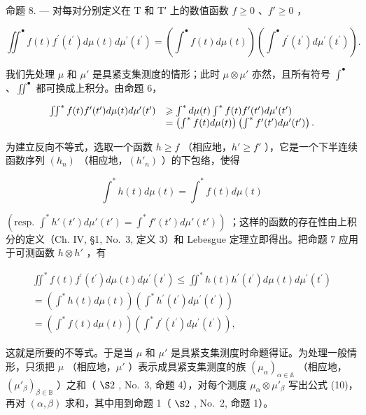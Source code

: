 命题 8. --- 对每对分别定义在 T 和 T′ 上的数值函数 \(f \geqslant 0\) 、\(f' \geqslant 0\) ，

\[
\iint^ {\bullet} f (t) f ^ {\prime} \left(t ^ {\prime}\right) d \mu (t) d \mu^ {\prime} \left(t ^ {\prime}\right) = \left(\int^ {\bullet} f (t) d \mu (t)\right) \left(\int^ {\bullet} f ^ {\prime} \left(t ^ {\prime}\right) d \mu^ {\prime} \left(t ^ {\prime}\right)\right).\tag{10}
\]

我们先处理 \(\mu\) 和 \(\mu'\) 是具紧支集测度的情形；此时 \(\mu \otimes \mu'\) 亦然，且所有符号 \(\int^{\bullet}\) 、\(\iint^{\bullet}\) 都可换成上积分。由命题 6，

\[
\begin{array}{r l} \iint^ {*} f (t) f ^ {\prime} (t ^ {\prime}) d \mu (t) d \mu^ {\prime} (t ^ {\prime}) & \geqslant \int^ {*} d \mu (t) \int^ {*} f (t) f ^ {\prime} (t ^ {\prime}) d \mu^ {\prime} (t ^ {\prime}) \\ & = \left(\int^ {*} f (t) d \mu (t)\right) \left(\int^ {*} f ^ {\prime} (t ^ {\prime}) d \mu^ {\prime} (t ^ {\prime})\right). \end{array}
\]

为建立反向不等式，选取一个函数 \(h \geqslant f\) （相应地，\(h' \geqslant f'\) ），它是一个下半连续函数序列 \((h_n)\) （相应地，\((h'_n)\) ）的下包络，使得

\[
\int^ {*} h (t) d \mu (t) = \int^ {*} f (t) d \mu (t)
\]

\((\text{resp. } \int^{*} h'(t') d\mu'(t') = \int^{*} f'(t') d\mu'(t'))\) ；这样的函数的存在性由上积分的定义（Ch. IV, §1, No.~3, 定义 3）和 Lebesgue 定理立即得出。把命题 7 应用于可测函数 \(h \otimes h'\) ，有

\[
\begin{array}{l} \iint^ {*} f (t) f ^ {\prime} (t ^ {\prime}) d \mu (t) d \mu^ {\prime} (t ^ {\prime}) \leqslant \iint^ {*} h (t) h ^ {\prime} (t ^ {\prime}) d \mu (t) d \mu^ {\prime} (t ^ {\prime}) \\ = \left(\int^ {*} h (t) d \mu (t)\right) \left(\int^ {*} h ^ {\prime} (t ^ {\prime}) d \mu^ {\prime} (t ^ {\prime})\right) \\ = \left(\int^ {*} f (t) d \mu (t)\right) \left(\int^ {*} f ^ {\prime} (t ^ {\prime}) d \mu^ {\prime} (t ^ {\prime})\right), \end{array}
\]

这就是所要的不等式。于是当 \(\mu\) 和 \(\mu'\) 是具紧支集测度时命题得证。为处理一般情形，只须把 \(\mu\) （相应地，\(\mu'\) ）表示成具紧支集测度的族 \((\mu_{\alpha})_{\alpha\in\mathbb{A}}\) （相应地，\((\mu'_{\beta})_{\beta\in\mathbb{B}}\) ）之和（ \(\S2\) , No.~3, 命题 4），对每个测度 \(\mu_{\alpha}\otimes\mu'_{\beta}\) 写出公式 (10)，再对 \((\alpha,\beta)\) 求和，其中用到命题 1（ \(\S2\) , No.~2, 命题 1）。

